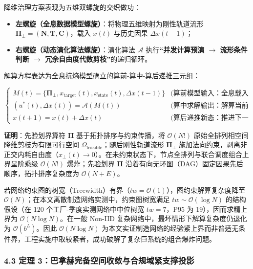 \documentclass[
]{article}
\providecommand{\tightlist}{%
  \setlength{\itemsep}{0pt}\setlength{\parskip}{0pt}}
\begin{document}
降维治理方案表现为五维双螺旋的交织做功：

\begin{itemize}
\tightlist
\item
  \textbf{左螺旋（全息数据模型螺旋）}：将物理五维映射为刚性轨道流形
  \(\mathbf{\Pi}_\bot = (\mathbf{N}, \mathbf{T}, \mathbf{C})\)，载入
  \(x(t)\) 与历史因果 \(\Delta x(t-1)\)；
\item
  \textbf{右螺旋（动态演化算法螺旋）}：演化算法 \(\mathcal{A}\)
  执行\textbf{``并发计算预演 \(\to\) 流形条件判断 \(\to\)
  冗余自由度代数剪枝''}的递归循环。
\end{itemize}

解算方程表达为全息抗熵模型确立的算前-算中-算后递推三元组：

\[
\begin{cases}
M(t) = \{\mathbf{\Pi}_\bot, x_{\mathrm{target}}(t), x_{\mathrm{state}}(t), \Delta x(t-1)\} & \text{(算前模型输入：全息载入物理五维态)} \\[4pt]
(u^\ast(t), \Delta x(t)) = \mathcal{A}(M(t)) & \text{(算中求解输出：解算当前控制与新跃迁)} \\[4pt]
x(t+1) = x(t) + \Delta x(t) & \text{(算后递推新态：推进下一时刻新状态)}
\end{cases}
\]

\textbf{证明}：先验划界算符 \(\mathbf{\Pi}\) 基于拓扑排序与约束传播，将
\(\mathcal{O}(N!)\) 原始全排列相空间降维剪枝为有限可行空间
\(\Omega_{\mathrm{feasible}}\)；随后刚性轨道流形 \(\mathbf{\Pi}_\bot\)
施加法向约束，剥离非正交内耗自由度（\(x_\bot(t) \to 0\)）。在未约束状态下，节点全排列与联合调度组合上界呈阶乘级
\(\mathcal{O}(N!)\) 爆炸；先验划界 \(\mathbf{\Pi}\)
沿着有向无环图（DAG）固定因果先后顺序，拓扑排序复杂度为
\(\mathcal{O}(N+E)\)。

若网络约束图的树宽（Treewidth）有界（\(tw = \mathcal{O}(1)\)），图约束解算复杂度降至
\(\mathcal{O}(N)\)；在本文离散制造网络实测中，约束图树宽满足
\(tw \sim \mathcal{O}(\log N)\) 的结构假设（在 120
个工厂-季度实测网络中中位树宽 \(tw = 7\)，P95 为 19），因而求精上界为
\(\mathcal{O}(N \log N)\)。在一般 Non-IID
复杂网络中，最坏情形下解算复杂度仍退化为 \(\mathcal{O}(b^L)\)。因此
\(\mathcal{O}(N \log N)\)
为本文实证制造网络的经验紧上界而非普适无条件界，工程实施中取较紧者，成功破解了复杂巨系统的组合爆炸问题。

\subsubsection{4.3 定理
3：巴拿赫完备空间收敛与合规域紧支撑投影}\label{ux5b9aux7406-3ux5df4ux62ffux8d6bux5b8cux5907ux7a7aux95f4ux6536ux655bux4e0eux5408ux89c4ux57dfux7d27ux652fux6491ux6295ux5f71}
\end{document}
